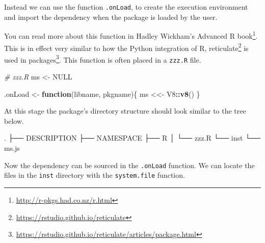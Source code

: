 \documentclass[
]{krantz}
\makeatletter
\newenvironment{Shaded}{\begin{snugshade}}{\end{snugshade}}
\newcommand{\CommentTok}[1]{\textcolor[rgb]{0.37,0.37,0.37}{\textit{#1}}}
\newcommand{\ControlFlowTok}[1]{\textcolor[rgb]{0.27,0.27,0.27}{\textbf{#1}}}
\newcommand{\DataTypeTok}[1]{\textcolor[rgb]{0.27,0.27,0.27}{#1}}
\newcommand{\ExtensionTok}[1]{#1}
\newcommand{\KeywordTok}[1]{\textcolor[rgb]{0.27,0.27,0.27}{\textbf{#1}}}
\newcommand{\NormalTok}[1]{#1}
\newcommand{\OperatorTok}[1]{\textcolor[rgb]{0.43,0.43,0.43}{\textbf{#1}}}
\newcommand{\OtherTok}[1]{\textcolor[rgb]{0.37,0.37,0.37}{#1}}
\newcommand{\StringTok}[1]{\textcolor[rgb]{0.5,0.5,0.5}{#1}}
\renewcommand{\href}[2]{#2\footnote{\url{#1}}}
\newenvironment{kframe}{%
\medskip{}
\setlength{\fboxsep}{.8em}
 \def\at@end@of@kframe{}%
 \ifinner\ifhmode%
  \def\at@end@of@kframe{\end{minipage}}%
  \begin{minipage}{\columnwidth}%
 \fi\fi%
 \def\FrameCommand##1{\hskip\@totalleftmargin \hskip-\fboxsep
 \colorbox{shadecolor}{##1}\hskip-\fboxsep
     \hskip-\linewidth \hskip-\@totalleftmargin \hskip\columnwidth}%
 \MakeFramed {\advance\hsize-\width
   \@totalleftmargin\z@ \linewidth\hsize
   \@setminipage}}%
 {\par\unskip\endMakeFramed%
 \at@end@of@kframe}
\renewenvironment{Shaded}{\begin{kframe}}{\end{kframe}}
\makeatother
\begin{document}
Instead we can use the function \texttt{.onLoad}, to create the execution environment and import the dependency when the package is loaded by the user.

You can read more about this function in Hadley Wickham's \href{http://r-pkgs.had.co.nz/r.html}{Advanced R book}. This is in effect very similar to how the Python integration of R, \href{https://rstudio.github.io/reticulate}{reticulate} \citep{R-reticulate} is \href{https://rstudio.github.io/reticulate/articles/package.html}{used in packages}. This function is often placed in a \texttt{zzz.R} file.

\begin{Shaded}
\begin{Highlighting}[]
\CommentTok{\# zzz.R}
\NormalTok{ms <{-}}\StringTok{ }\OtherTok{NULL}

\NormalTok{.onLoad <{-}}\StringTok{ }\ControlFlowTok{function}\NormalTok{(libname, pkgname)\{}
\NormalTok{  ms <<{-}}\StringTok{ }\NormalTok{V8}\OperatorTok{::}\KeywordTok{v8}\NormalTok{()}
\NormalTok{\}}
\end{Highlighting}
\end{Shaded}

At this stage the package's directory structure should look similar to the tree below.

\begin{Shaded}
\begin{Highlighting}[]
\ExtensionTok{.}
\NormalTok{├── }\ExtensionTok{DESCRIPTION}
\NormalTok{├── }\ExtensionTok{NAMESPACE}
\NormalTok{├── }\ExtensionTok{R}
\NormalTok{│   └── }\ExtensionTok{zzz.R}
\NormalTok{└── }\ExtensionTok{inst}
\NormalTok{    └── }\ExtensionTok{ms.js}
\end{Highlighting}
\end{Shaded}

Now the dependency can be sourced in the \texttt{.onLoad} function. We can locate the files in the \texttt{inst} directory with the \texttt{system.file} function.

\begin{Shaded}
\end{Shaded}
\end{document}
